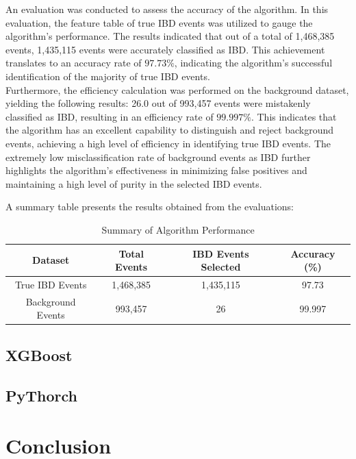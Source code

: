 An evaluation was conducted to assess the accuracy of the algorithm. In this evaluation, the feature table of true IBD events was utilized to gauge the algorithm's performance. The results indicated that out of a total of 1,468,385 events, 1,435,115 events were accurately classified as IBD. This achievement translates to an accuracy rate of $97.73\%$, indicating the algorithm's successful identification of the majority of true IBD events.\\


Furthermore, the efficiency calculation was performed on the background dataset, yielding the following results: 26.0 out of 993,457 events were mistakenly classified as IBD, resulting in an efficiency rate of $99.997\%$. This indicates that the algorithm has an excellent capability to distinguish and reject background events, achieving a high level of efficiency in identifying true IBD events. The extremely low misclassification rate of background events as IBD further highlights the algorithm's effectiveness in minimizing false positives and maintaining a high level of purity in the selected IBD events.


A summary table presents the results obtained from the evaluations:

\begin{table}[ht]
	\centering
	\caption{Summary of Algorithm Performance}
	\label{tab:algorithm-results}
	\begin{tabular}{|c|c|c|c|}
		\hline
		Dataset & Total Events & IBD Events Selected & Accuracy (\%) \\ \hline\hline
		True IBD Events & 1,468,385 & 1,435,115 & 97.73 \\ \hline
		Background Events & 993,457 & 26 & 99.997 \\ \hline
	\end{tabular}
\end{table}

\subsection{XGBoost}
\subsection{PyThorch}

\section{Conclusion}

